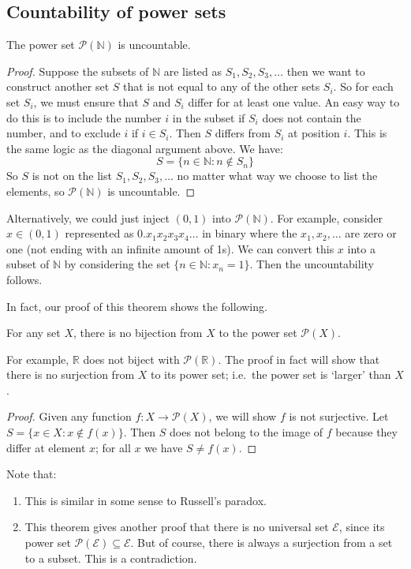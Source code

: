 \subsection{Countability of power sets}
\begin{theorem}
	The power set \(\mathcal P(\mathbb N)\) is uncountable.
\end{theorem}
\begin{proof}
	Suppose the subsets of \(\mathbb N\) are listed as \(S_1, S_2, S_3, \dots\) then we want to construct another set \(S\) that is not equal to any of the other sets \(S_i\).
	So for each set \(S_i\), we must ensure that \(S\) and \(S_i\) differ for at least one value.
	An easy way to do this is to include the number \(i\) in the subset if \(S_i\) does not contain the number, and to exclude \(i\) if \(i \in S_i\).
	Then \(S\) differs from \(S_i\) at position \(i\).
	This is the same logic as the diagonal argument above.
	We have:
	\[
		S = \{ n \in \mathbb N : n \notin S_n \}
	\]
	So \(S\) is not on the list \(S_1, S_2, S_3, \dots\) no matter what way we choose to list the elements, so \(\mathcal P(\mathbb N)\) is uncountable.
\end{proof}
\begin{remark}
	Alternatively, we could just inject \((0, 1)\) into \(\mathcal P(\mathbb N)\).
	For example, consider \(x \in (0, 1)\) represented as \(0.x_1x_2x_3x_4\dots\) in binary where the \(x_1, x_2, \dots\) are zero or one (not ending with an infinite amount of 1s).
	We can convert this \(x\) into a subset of \(\mathbb N\) by considering the set \(\{ n \in \mathbb N : x_n = 1 \}\).
	Then the uncountability follows.
\end{remark}
In fact, our proof of this theorem shows the following.
\begin{theorem}
	For any set \(X\), there is no bijection from \(X\) to the power set \(\mathcal P(X)\).
\end{theorem}
For example, \(\mathbb R\) does not biject with \(\mathcal P(\mathbb R)\).
The proof in fact will show that there is no surjection from \(X\) to its power set; i.e.\ the power set is `larger' than \(X\).
\begin{proof}
	Given any function \(f\colon X \to \mathcal P(X)\), we will show \(f\) is not surjective.
	Let \(S = \{ x \in X: x \notin f(x) \}\).
	Then \(S\) does not belong to the image of \(f\) because they differ at element \(x\); for all \(x\) we have \(S \neq f(x)\).
\end{proof}
\begin{remark}
	Note that:
	\begin{enumerate}
		\item This is similar in some sense to Russell's paradox.
		\item This theorem gives another proof that there is no universal set \(\mathscr E\), since its power set \(\mathcal P(\mathscr E) \subseteq \mathscr E\).
		      But of course, there is always a surjection from a set to a subset.
		      This is a contradiction.
	\end{enumerate}
\end{remark}

